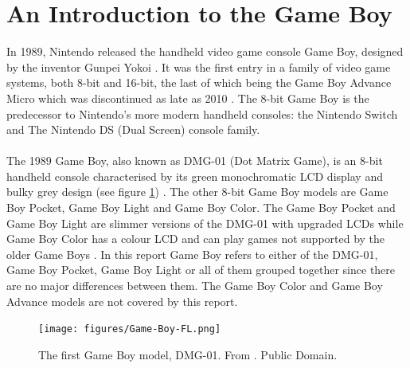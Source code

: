 \section{An Introduction to the Game Boy}
In 1989, Nintendo released the handheld video game console Game Boy, designed by the inventor Gunpei Yokoi \cite{gameboylook} \cite{gameboytimeline1}. It was the first entry in a family of video game systems, both 8-bit and 16-bit, the last of which being the Game Boy Advance Micro which was discontinued as late as 2010 \cite{gameboytimeline1}. The 8-bit Game Boy is the predecessor to Nintendo's more modern handheld consoles: the Nintendo Switch and The Nintendo DS (Dual Screen) console family.\\
\\
The 1989 Game Boy, also known as DMG-01 (Dot Matrix Game), is an 8-bit handheld console characterised by its green monochromatic LCD display and bulky grey design (see figure \ref{fig:GameBoy-fig}) \cite{gameboylook}. The other 8-bit Game Boy models are Game Boy Pocket, Game Boy Light and Game Boy Color. The Game Boy Pocket and Game Boy Light are slimmer versions of the DMG-01 with upgraded LCDs while Game Boy Color has a colour LCD and can play games not supported by the older Game Boys \cite{gameboytimeline1}. In this report Game Boy refers to either of the DMG-01, Game Boy Pocket, Game Boy Light or all of them grouped together since there are no major differences between them. The Game Boy Color and Game Boy Advance models are not covered by this report.

\begin{figure}[H]
    \centering
    \texttt{[image: figures/Game-Boy-FL.png]}
    \caption{The first Game Boy model, DMG-01. From \cite{gameboy-wikipedia}. Public Domain.}
    \label{fig:GameBoy-fig}
\end{figure}

